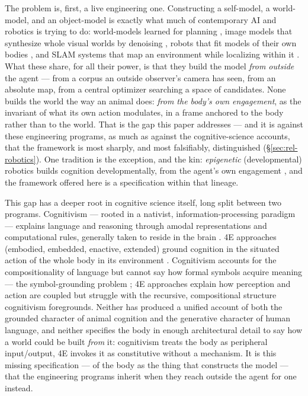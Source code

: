 \documentclass{article}
\begin{document}
The problem is, first, a live engineering one.  Constructing a
self-model, a world-model, and an object-model is exactly what much of
contemporary AI and robotics is trying to do: world-models learned for
planning \citep{Ha2018WorldModels,LeCun2022WorldModels,Hafner2020Dreamer},
image models that synthesize whole visual worlds by denoising
\citep{Rombach2022LatentDiffusion}, robots that fit models of their own
bodies \citep{Bongard2006SelfModeling}, and SLAM systems that map an
environment while localizing within it
\citep{DurrantWhyteBailey2006SLAM}.  What these share, for all their
power, is that they build the model \emph{from outside} the agent --- from
a corpus an outside observer's camera has seen, from an absolute map, from
a central optimizer searching a space of candidates.  None builds the
world the way an animal does: \emph{from the body's own engagement}, as
the invariant of what its own action modulates, in a frame anchored to the
body rather than to the world.  That is the gap this paper addresses --- and
it is against these engineering programs, as much as against the
cognitive-science accounts, that the framework is most sharply, and most
falsifiably, distinguished (\S\ref{sec:rel-robotics}).  One tradition is
the exception, and the kin: \emph{epigenetic} (developmental) robotics
builds cognition developmentally, from the agent's own engagement
\citep{Balkenius2001EpigeneticRobotics}, and the framework offered here is
a specification within that lineage.

This gap has a deeper root in cognitive science itself, long split between
two programs.  Cognitivism --- rooted in a nativist, information-processing
paradigm --- explains language and reasoning through amodal representations
and computational rules, generally taken to reside in the brain
\citep{Chomsky1957SyntacticStructures,Fodor1975LanguageOfThought,Pinker1994LanguageInstinct}.
4E approaches (embodied, embedded, enactive, extended) ground cognition in
the situated action of the whole body in its environment
\citep{VarelaThompsonRosch1991,MaturanaVarela1980,noe_action_2004,clark1997being,Thompson2007MindInLife}.
Cognitivism accounts for the compositionality of language but cannot say
how formal symbols acquire meaning --- the symbol-grounding problem
\citep{Harnad1990SymbolGrounding}; 4E approaches explain how perception and
action are coupled but struggle with the recursive, compositional
structure cognitivism foregrounds.  Neither has produced a unified account
of both the grounded character of animal cognition and the generative
character of human language, and neither specifies the body in enough
architectural detail to say how a world could be built \emph{from} it:
cognitivism treats the body as peripheral input/output, 4E invokes it as
constitutive without a mechanism.  It is this missing specification --- of
the body as the thing that constructs the model --- that the engineering
programs inherit when they reach outside the agent for one instead.
\end{document}
